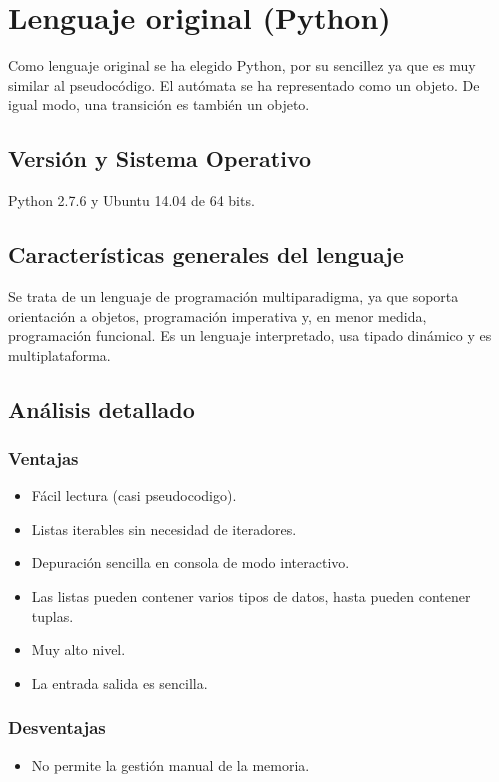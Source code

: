 \documentclass[12pt,a4paper]{article}
\begin{document}

\section{Lenguaje original (Python)}
Como lenguaje original se ha elegido Python, por su sencillez ya que es muy
similar al pseudocódigo. El autómata se ha representado como un objeto. De igual 
modo, una transición es también un objeto.

\subsection{Versión y Sistema Operativo}
Python 2.7.6 y Ubuntu 14.04 de 64 bits.

\subsection{Características generales del lenguaje}
Se trata de un lenguaje de programación multiparadigma, ya que soporta 
orientación a objetos, programación imperativa y, en menor medida, programación 
funcional. Es un lenguaje interpretado, usa tipado dinámico y es 
multiplataforma.

\subsection{Análisis detallado}
\subsubsection{Ventajas}
\begin{itemize}
\item Fácil lectura (casi pseudocodigo).
\item Listas iterables sin necesidad de iteradores.
\item Depuración sencilla en consola de modo interactivo.
\item Las listas pueden contener varios tipos de datos, hasta pueden contener 
tuplas.
\item Muy alto nivel.
\item La entrada salida es sencilla.
\end{itemize}
\subsubsection{Desventajas}
\begin{itemize}
\item No permite la gestión manual de la memoria.
\end{itemize}
  
\end{document}
